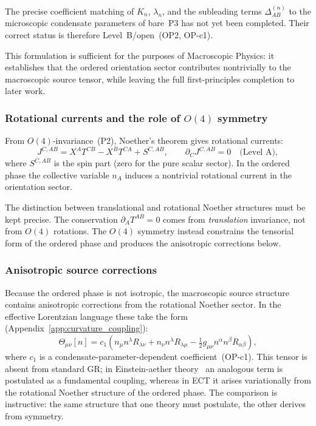 \documentclass[11pt,a4paper]{article}
\numberwithin{equation}{section}
\begin{document}
The precise coefficient matching of $K_n$, $\lambda_n$, and the
subleading terms $\Delta_{AB}^{(n)}$ to the microscopic condensate
parameters of bare~P3 has not yet been completed.
Their correct status is therefore Level~B/open~(OP2, OP-c1).

This formulation is sufficient for the purposes of Macroscopic Physics:
it establishes that the ordered orientation sector contributes
nontrivially to the macroscopic source tensor, while leaving the full
first-principles completion to later work.

\subsubsection*{Rotational currents and the role of $O(4)$ symmetry}

From $O(4)$-invariance~(P2), Noether's theorem gives rotational currents:
\begin{equation}
  \label{eq:Noether_rotation}
  J^{C,AB}
  = X^A T^{CB} - X^B T^{CA} + S^{C,AB},
  \qquad
  \partial_C J^{C,AB} = 0
  \quad\text{(Level~A)},
\end{equation}
where $S^{C,AB}$ is the spin part (zero for the pure scalar sector).
In the ordered phase the collective variable $n_A$ induces a nontrivial
rotational current in the orientation sector.

The distinction between translational and rotational Noether structures
must be kept precise.
The conservation $\partial_A T^{AB}=0$ comes from \emph{translation}
invariance, not from $O(4)$ rotations.
The $O(4)$ symmetry instead constrains the tensorial form of the
ordered phase and produces the anisotropic corrections below.

\subsubsection*{Anisotropic source corrections}

Because the ordered phase is not isotropic, the macroscopic source
structure contains anisotropic corrections from the rotational Noether
sector.
In the effective Lorentzian language these take the form
(Appendix~\ref{app:curvature_coupling}):
\begin{equation}
  \label{eq:Theta_n}
  \Theta_{\mu\nu}[n]
  = c_1\!\left(
    n_\mu n^\lambda R_{\lambda\nu}
    + n_\nu n^\lambda R_{\lambda\mu}
    - \tfrac{1}{2}g_{\mu\nu}n^\alpha n^\beta R_{\alpha\beta}
  \right),
\end{equation}
where $c_1$ is a condensate-parameter-dependent coefficient~(OP-c1).
This tensor is absent from standard GR; in Einstein-aether
theory~\cite{Jacobson2004} an analogous term is postulated as a
fundamental coupling, whereas in ECT it arises variationally from
the rotational Noether structure of the ordered phase.
The comparison is instructive: the same structure that one theory must
postulate, the other derives from symmetry.
\end{document}
